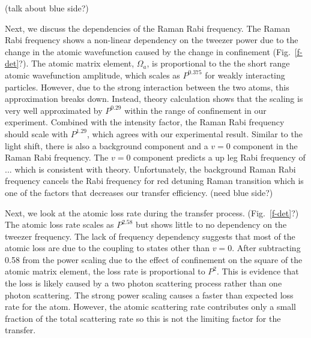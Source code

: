 \documentclass[aps,prl,twocolumn,groupedaddress]{revtex4-1}
\begin{document}
(talk about blue side?)

Next, we discuss the dependencies of the Raman Rabi frequency. The Raman Rabi frequency shows a non-linear dependency on the tweezer power due to the change in the atomic wavefunction caused by the change in confinement (Fig.~\ref{f-det}?). The atomic matrix element, $\Omega_a$, is proportional to the the short range atomic wavefunction amplitude, which scales as $ P^{0.375} $ for weakly interacting particles. However, due to the strong interaction between the two atoms, this approximation breaks down. Instead, theory calculation shows that the scaling is very well approximated by $ P^{0.29} $ within the range of confinement in our experiment. Combined with the intensity factor, the Raman Rabi frequency should scale with $P^{1.29}$, which agrees with our experimental result. Similar to the light shift, there is also a background component and a $v=0$ component in the Raman Rabi frequency. The $v=0$ component predicts a up leg Rabi frequency of $...$ which is consistent with theory. Unfortunately, the background Raman Rabi frequency cancels the Rabi frequency for red detuning Raman transition which is one of the factors that decreases our transfer efficiency. (need blue side?)

Next, we look at the atomic loss rate during the transfer process. (Fig.~\ref{f-det}?)
The atomic loss rate scales as $P^{2.58}$ but shows little to no dependency on the tweezer frequency. The lack of frequency dependency suggests that most of the atomic loss are due to the coupling to states other than $v=0$. After subtracting 0.58 from the power scaling due to the effect of confinement on the square of the atomic matrix element, the loss rate is proportional to $P^2$. This is evidence that the loss is likely caused by a two photon scattering process rather than one photon scattering. The strong power scaling causes a faster than expected loss rate for the atom. However, the atomic scattering rate contributes only a small fraction of the total scattering rate so this is not the limiting factor for the transfer.
\end{document}
